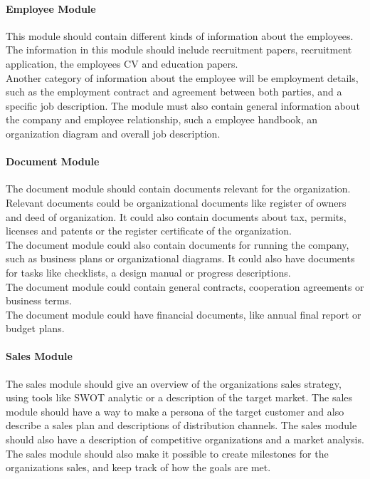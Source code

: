 \paragraph{Employee Module}
This module should contain different kinds of information about the employees. The information in this module should include recruitment papers, recruitment application, the employees CV and education papers. \\
Another category of information about the employee will be employment details, such as the employment contract and agreement between both parties, and a specific job description. The module must also contain  general information about the company and employee relationship, such a employee handbook, an organization diagram and overall job description.

\paragraph{Document Module}
The document module should contain documents relevant for the organization.\\
Relevant documents could be organizational documents like register of owners and deed of organization. It could also contain documents about tax, permits, licenses and patents or the register certificate of the organization.\\
The document module could also contain documents for running the company, such as business plans or organizational diagrams. It could also have documents for tasks like checklists, a design manual or progress descriptions.\\
The document module could contain general contracts, cooperation agreements or business terms.\\
The document module could have financial documents, like annual final report or budget plans. 

\paragraph{Sales Module}
The sales module should give an overview of the organizations sales strategy, using tools like SWOT analytic or a description of the target market. The sales module should have a way to make a persona of the target customer and also describe a sales plan and descriptions of distribution channels. The sales module should also have a description of competitive organizations and a market analysis. The sales module should also make it possible to create milestones for the organizations sales, and keep track of how the goals are met.

